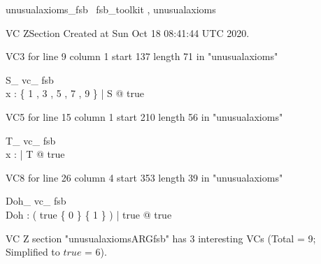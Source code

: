 \documentclass{article}
\begin{document}

\begin{zsection}	 \SECTION unusualaxioms\_fsb \parents~fsb\_toolkit , unusualaxioms
\end{zsection}

VC ZSection Created at Sun Oct 18 08:41:44 UTC 2020.

VC3 for line 9 column 1 start 137 length 71 in "unusualaxioms"
\begin{theorem}{ S\_ vc\_ fsb}\\
 \exists x : \{ 1 , 3 , 5 , 7 , 9 \} | S @ true \\

\end{theorem}

VC5 for line 15 column 1 start 210 length 56 in "unusualaxioms"
\begin{theorem}{ T\_ vc\_ fsb}\\
 \exists x : \nat | T @ true \\

\end{theorem}

VC8 for line 26 column 4 start 353 length 39 in "unusualaxioms"
\begin{theorem}{ Doh\_ vc\_ fsb}\\
 \exists Doh : \power ( \IF true \THEN \{ 0 \} \ELSE \{ 1 \} ) | true @ true \\

\end{theorem}



 VC Z section "unusualaxiomsARGfsb" has $3$ interesting VCs (Total = 9; Simplified to $true$ = 6).



\end{document}

